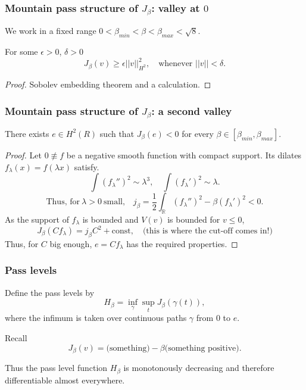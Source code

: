 \documentclass[9pt, english]{beamer}
\theoremstyle{definition}
\newcommand{\R}{\mathbb{R}}                     %
\begin{document}
\begin{frame}
\frametitle{Mountain pass structure of $J_\beta$: valley at $0$} We
work in a fixed range $0 < \beta_{min} < \beta < \beta_{max} < \sqrt
8$.
\begin{lemma}
For some $\epsilon > 0$, $\delta > 0$
\[
J_\beta(v) \geq \epsilon ||v||_{H^2}^2, \quad \text{whenever } ||v||
< \delta.
\]
\end{lemma}
\begin{proof}
Sobolev embedding theorem and a calculation.
\end{proof}
\end{frame}

\begin{frame}
\frametitle{Mountain pass structure of $J_\beta$: a second valley}
\begin{lemma}
There exists $e \in H^2(R)$ such that $J_\beta(e)<0$ for every
$\beta \in [\beta_{min},\beta_{max}]$.
\end{lemma}
\begin{proof}
Let $0 \not\equiv f$ be a negative smooth function with compact
support. Its dilates $f_\lambda(x)=f(\lambda x)$ satisfy.
\[
\int (f_\lambda'')^2 \sim \lambda^3, \quad \int (f_\lambda')^2 \sim
\lambda.
\]
\[
\text{Thus, for}\  \lambda>0\ \text{small,} \quad j_\beta = \frac12
\int_\R (f_\lambda'')^2 - \beta (f_\lambda')^2 < 0.
\]
As the support of $f_\lambda$ is bounded and $V(v)$ is bounded for
$v\leq 0$,
\[
J_\beta(C f_\lambda) = j_\beta C^2 + \text{const}, \quad \text{(this
is where the cut-off comes in!)}
\]
Thus, for $C$ big enough, $e = C f_\lambda$ has the required
properties.
\end{proof}
\end{frame}

\begin{frame}
\frametitle{Pass levels} Define the pass levels by
\[
H_\beta = \inf_\gamma \sup_{t} J_\beta(\gamma(t)),
\]
where the infimum is taken over continuous paths $\gamma$ from $0$
to $e$.


\pause Recall
\[
J_\beta(v) = \text{(something)} - \beta \text{(something positive)}.
\]

Thus the pass level function $H_\beta$ is monotonously decreasing
and therefore differentiable almost everywhere.
\end{frame}
\end{document}
